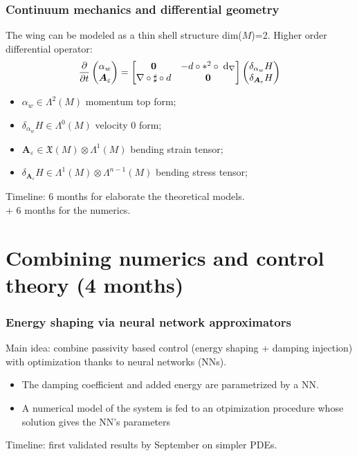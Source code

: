 \documentclass{beamer}
\begin{document}
\begin{frame}\frametitle{Continuum mechanics and differential geometry}
	
	The wing can be modeled as a thin shell structure dim($M$)=2. Higher order differential operator:
	\begin{equation*}
	\diffp{}{t}
	\begin{pmatrix}
		{\alpha}_w \\ \bm{A}_\varepsilon
	\end{pmatrix}=
	\begin{bmatrix}
		\bm{0} & -d \circ *^2 \circ \d{}_{\nabla} \\
		\nabla \circ \sharp \circ d & \bm{0}
	\end{bmatrix}
	\begin{pmatrix}
		\delta_{\alpha_w} H \\ \delta_{\bm{A}_\varepsilon} H
	\end{pmatrix}
\end{equation*}

\begin{itemize}
	\item ${\alpha}_w \in \Lambda^2(M)$ momentum top form;
	\item $\delta_{{\alpha}_w} H \in \Lambda^{0}(M)$ velocity $0$ form;
	\item $\bm{A}_\varepsilon \in \mathfrak{X}(M) \otimes \Lambda^1(M)$ bending strain tensor;
	\item $\delta_{\bm{A}_\varepsilon} H \in \Lambda^{1}(M) \otimes \Lambda^{n-1}(M)$ bending stress tensor;
\end{itemize} 
\vspace{.5cm}
Timeline: 6 months for elaborate the theoretical models. \\
+ 6 months for the numerics.
\end{frame}

\section{Combining numerics and control theory (4 months)}

\begin{frame}\frametitle{Energy shaping via neural network approximators}
Main idea: combine passivity based control (energy shaping + damping injection) with optimization thanks to neural networks (NNs).

\begin{itemize}
	\item The damping coefficient and added energy are parametrized by a NN.
	\item A numerical model of the system is fed to an otpimization procedure whose solution gives the NN's parameters
\end{itemize}
\vspace{.5cm}
Timeline: first validated results by September on simpler PDEs.
\end{frame}
\end{document}
